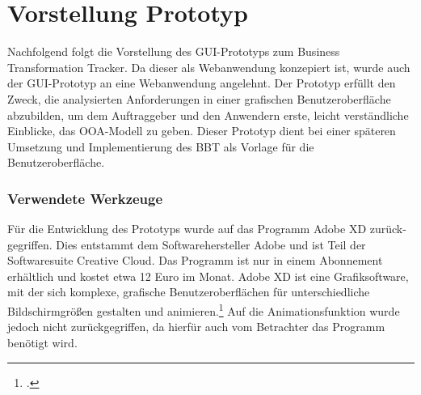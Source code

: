 \section{Vorstellung Prototyp}
Nachfolgend folgt die Vorstellung des GUI-Prototyps zum Business Transformation Tracker. Da dieser als Webanwendung konzepiert ist, wurde auch der GUI-Prototyp an eine Webanwendung angelehnt. Der Prototyp erfüllt den Zweck, die analysierten Anforderungen in einer grafischen Benutzeroberfläche abzubilden, um dem Auftraggeber und den Anwendern erste, leicht verständliche Einblicke, das OOA-Modell zu geben. Dieser Prototyp dient bei einer späteren Umsetzung und Implementierung des BBT als Vorlage für die Benutzeroberfläche.

\subsubsection{Verwendete Werkzeuge}
Für die Entwicklung des Prototyps wurde auf das Programm Adobe XD zurück-gegriffen. Dies entstammt dem Softwarehersteller Adobe und ist Teil der Softwaresuite \glqq{}Creative Cloud\grqq{}. Das Programm ist nur in einem Abonnement erhältlich und kostet etwa 12 Euro im Monat. Adobe XD ist eine Grafiksoftware, mit der sich komplexe, grafische Benutzeroberflächen für unterschiedliche Bildschirmgrößen gestalten und animieren.\footcite[Vgl.][]{adobe} Auf die Animationsfunktion wurde jedoch nicht zurückgegriffen, da hierfür auch vom Betrachter das Programm benötigt wird.

